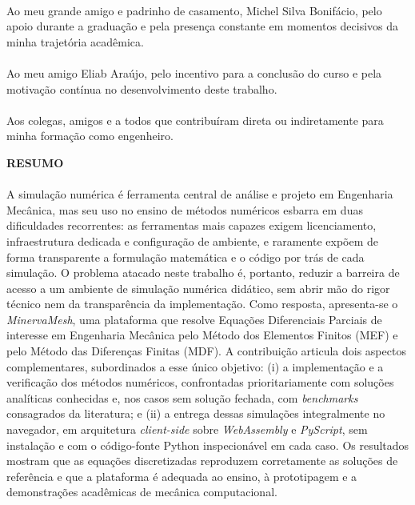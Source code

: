 \paragraph{}Ao meu grande amigo e padrinho de casamento, Michel Silva Bonifácio, pelo apoio durante a graduação e pela presença constante em momentos decisivos da minha trajetória acadêmica.

\paragraph{}Ao meu amigo Eliab Araújo, pelo incentivo para a conclusão do curso e pela motivação contínua no desenvolvimento deste trabalho.

\paragraph{}Aos colegas, amigos e a todos que contribuíram direta ou indiretamente para minha formação como engenheiro.

\pagebreak


\begin{center}
\textbf{RESUMO}
\end{center}
      \vspace{0.5cm}

\paragraph{}A simulação numérica é ferramenta central de análise e projeto em Engenharia Mecânica, mas seu uso no ensino de métodos numéricos esbarra em duas dificuldades recorrentes: as ferramentas mais capazes exigem licenciamento, infraestrutura dedicada e configuração de ambiente, e raramente expõem de forma transparente a formulação matemática e o código por trás de cada simulação. O problema atacado neste trabalho é, portanto, reduzir a barreira de acesso a um ambiente de simulação numérica didático, sem abrir mão do rigor técnico nem da transparência da implementação. Como resposta, apresenta-se o \textit{MinervaMesh}, uma plataforma que resolve Equações Diferenciais Parciais de interesse em Engenharia Mecânica pelo Método dos Elementos Finitos (MEF) e pelo Método das Diferenças Finitas (MDF). A contribuição articula dois aspectos complementares, subordinados a esse único objetivo: (i) a implementação e a verificação dos métodos numéricos, confrontadas prioritariamente com soluções analíticas conhecidas e, nos casos sem solução fechada, com \textit{benchmarks} consagrados da literatura; e (ii) a entrega dessas simulações integralmente no navegador, em arquitetura \textit{client-side} sobre \textit{WebAssembly} e \textit{PyScript}, sem instalação e com o código-fonte Python inspecionável em cada caso. Os resultados mostram que as equações discretizadas reproduzem corretamente as soluções de referência e que a plataforma é adequada ao ensino, à prototipagem e a demonstrações acadêmicas de mecânica computacional.
